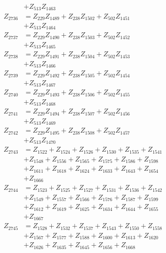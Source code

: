 \begin{multicols}{2}
\begin{align}
&+ Z_{513}Z_{1463} \nonumber \\
Z_{2736} &= Z_{229}Z_{1489} + Z_{238}Z_{1502} + Z_{502}Z_{1451}  \nonumber \\
&+ Z_{513}Z_{1464} \nonumber \\
Z_{2737} &= Z_{229}Z_{1490} + Z_{238}Z_{1503} + Z_{502}Z_{1452}  \nonumber \\
&+ Z_{513}Z_{1465} \nonumber \\
Z_{2738} &= Z_{229}Z_{1491} + Z_{238}Z_{1504} + Z_{502}Z_{1453}  \nonumber \\
&+ Z_{513}Z_{1466} \nonumber \\
Z_{2739} &= Z_{229}Z_{1492} + Z_{238}Z_{1505} + Z_{502}Z_{1454}  \nonumber \\
&+ Z_{513}Z_{1467} \nonumber \\
Z_{2740} &= Z_{229}Z_{1493} + Z_{238}Z_{1506} + Z_{502}Z_{1455}  \nonumber \\
&+ Z_{513}Z_{1468} \nonumber \\
Z_{2741} &= Z_{229}Z_{1494} + Z_{238}Z_{1507} + Z_{502}Z_{1456}  \nonumber \\
&+ Z_{513}Z_{1469} \nonumber \\
Z_{2742} &= Z_{229}Z_{1495} + Z_{238}Z_{1508} + Z_{502}Z_{1457}  \nonumber \\
&+ Z_{513}Z_{1470} \nonumber \\
Z_{2743} &= Z_{1522} + Z_{1524} + Z_{1526} + Z_{1530} + Z_{1535} + Z_{1541}  \nonumber \\
&+ Z_{1548} + Z_{1556} + Z_{1565} + Z_{1575} + Z_{1586} + Z_{1598}  \nonumber \\
&+ Z_{1611} + Z_{1618} + Z_{1624} + Z_{1633} + Z_{1643} + Z_{1654}  \nonumber \\
&+ Z_{1666} \nonumber \\
Z_{2744} &= Z_{1523} + Z_{1525} + Z_{1527} + Z_{1531} + Z_{1536} + Z_{1542}  \nonumber \\
&+ Z_{1549} + Z_{1557} + Z_{1566} + Z_{1576} + Z_{1587} + Z_{1599}  \nonumber \\
&+ Z_{1612} + Z_{1619} + Z_{1625} + Z_{1634} + Z_{1644} + Z_{1655}  \nonumber \\
&+ Z_{1667} \nonumber \\
Z_{2745} &= Z_{1528} + Z_{1532} + Z_{1537} + Z_{1543} + Z_{1550} + Z_{1558}  \nonumber \\
&+ Z_{1567} + Z_{1577} + Z_{1588} + Z_{1600} + Z_{1613} + Z_{1620}  \nonumber \\
&+ Z_{1626} + Z_{1635} + Z_{1645} + Z_{1656} + Z_{1668} \nonumber \\

\end{align}
\end{multicols}
